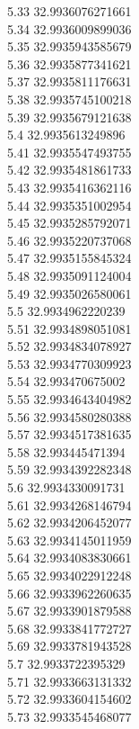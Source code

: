 {5.33	32.9936076271661\\
5.34	32.9936009899036\\
5.35	32.9935943585679\\
5.36	32.9935877341621\\
5.37	32.9935811176631\\
5.38	32.9935745100218\\
5.39	32.9935679121638\\
5.4	32.9935613249896\\
5.41	32.9935547493755\\
5.42	32.9935481861733\\
5.43	32.9935416362116\\
5.44	32.9935351002954\\
5.45	32.9935285792071\\
5.46	32.9935220737068\\
5.47	32.9935155845324\\
5.48	32.9935091124004\\
5.49	32.9935026580061\\
5.5	32.9934962220239\\
5.51	32.9934898051081\\
5.52	32.9934834078927\\
5.53	32.9934770309923\\
5.54	32.993470675002\\
5.55	32.9934643404982\\
5.56	32.9934580280388\\
5.57	32.9934517381635\\
5.58	32.993445471394\\
5.59	32.9934392282348\\
5.6	32.9934330091731\\
5.61	32.9934268146794\\
5.62	32.9934206452077\\
5.63	32.9934145011959\\
5.64	32.9934083830661\\
5.65	32.9934022912248\\
5.66	32.9933962260635\\
5.67	32.9933901879588\\
5.68	32.9933841772727\\
5.69	32.9933781943528\\
5.7	32.9933722395329\\
5.71	32.9933663131332\\
5.72	32.9933604154602\\
5.73	32.9933545468077\\
}
